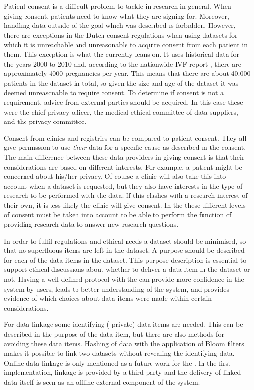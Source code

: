 Patient consent is a difficult problem to tackle in research in general.
When giving consent, patients need to know what they are signing for. Moreover, handling data outside of the goal which was described is forbidden.
However, there are exceptions in the Dutch consent regulations 
when using datasets for which it is unreachable and unreasonable to acquire consent from each patient in them.
This exception is what the \ivfsystem{} currently leans on. 
It uses historical data for the years 2000 to 2010 and, according to the nationwide IVF report \cite{ivfReportNVOG}, there are approximately 4000 pregnancies per year.
This means that there are about 40.000 patients in the dataset in total, so 
given the size and age of the dataset it was deemed unreasonable to require consent.
To determine if consent is not a requirement, advice from external parties should be acquired.
In this case these were the \AMC{} chief privacy officer, the medical ethical committee of data suppliers, and the \PRN{} privacy committee.

Consent from clinics and registries can be compared to patient consent.
They all give permission to use \emph{their} data for a specific cause as described in the consent.
The main difference between these data providers in giving consent is that their considerations are based on different interests.
For example, a patient might be concerned about his/her privacy.
Of course a clinic will also take this into account when a dataset is requested, but they also have interests in the type of research to be performed with the data.
If this clashes with a research interest of their own, it is less likely the clinic will give consent.
In the \ivfsystem{} these different levels of consent must be taken into account  to be able to perform the function of providing research data to answer new research questions.

In order to fulfil regulations and ethical needs a dataset should be minimised, so that no superfluous items are left in the dataset.
A purpose should be described for each of the data items in the dataset. 
This purpose description is essential to support ethical discussions about whether to deliver a data item in the dataset or not.
Having a well-defined protocol with the \ivfsystem{} can provide more confidence in the system by users, leads to better understanding of the system, and provides evidence of which choices about data items were made within certain considerations.

For data linkage some identifying (\ie{} private) data items are needed.
This can be described in the purpose of the data item, but there are also methods for avoiding these data items.
Hashing of data with the application of Bloom filters \cite{s22schnell2009} makes it possible to link two datasets without revealing the identifying data.
Online data linkage is only mentioned as a future work for the \ivfsystem{}.
In the first implementation, linkage is provided by a third-party and the delivery of linked data itself is seen as an offline external component of the system.


